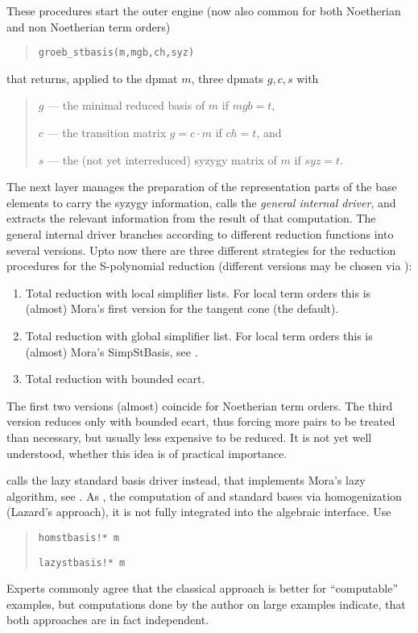 These procedures start the outer \gr engine (now also common for both
Noetherian and non Noetherian term orders)
\begin{quote}
\verb|groeb_stbasis(m,mgb,ch,syz)|
\end{quote}
that returns, applied to the dpmat $m$, three dpmats $g,c,s$ with
\begin{quote}
$g$ --- the minimal reduced \gr basis of $m$ if $mgb=t$,

$c$ --- the transition matrix $g=c\cdot m$ if $ch=t$, and

$s$ --- the (not yet interreduced) syzygy matrix of $m$ if $syz=t$.
\end{quote}

The next layer manages the preparation of the representation parts
of the base elements to carry the syzygy information, calls the
{\em general internal driver}, and extracts the relevant information
from the result of that computation. The general internal driver
branches according to different reduction functions into several
versions. Upto now there are three different strategies for the
reduction procedures for the S-polynomial reduction (different
versions may be chosen via ):
\begin{enumerate}
\item Total reduction with local simplifier lists. For local term
orders this is (almost) Mora's first version for the tangent cone (the
default).

\item Total reduction with global simplifier list. For local term
orders this is (almost) Mora's SimpStBasis, see \cite{MPT}.

\item Total reduction with bounded ecart.
\end{enumerate}
The first two versions (almost) coincide for Noetherian term
orders. The third version reduces only with bounded ecart, thus
forcing more pairs to be treated than necessary, but usually less
expensive to be reduced. It is not yet well understood, whether this
idea is of practical importance.

 calls the lazy standard basis driver instead,
that implements Mora's lazy algorithm, see \cite{MPT}. As
, the computation of \gr and standard bases via
homogenization (Lazard's approach), it is not fully integrated into
the algebraic interface. Use
\begin{quote}
\verb|homstbasis!* m|


\verb|lazystbasis!* m|

\end{quote}
Experts commonly agree that the classical approach is better for
``computable'' examples, but computations done by the author
on large examples indicate, that both approaches are in fact
independent.
\medskip

